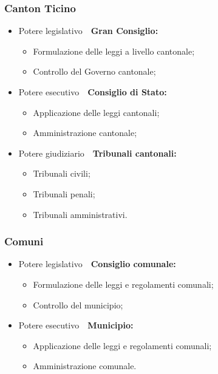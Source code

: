 \documentclass{article}
\begin{document}
\subsubsection{Canton Ticino}
\begin{itemize}
    \item Potere legislativo\ \textrightarrow\ \textbf{Gran Consiglio:}
        \begin{itemize}
            \item Formulazione delle leggi a livello cantonale;
            \item Controllo del Governo cantonale;
        \end{itemize}
    \item Potere esecutivo\ \textrightarrow\ \textbf{Consiglio di Stato:}
        \begin{itemize}
            \item Applicazione delle leggi cantonali;
            \item Amministrazione cantonale;
        \end{itemize}
    \item Potere giudiziario\ \textrightarrow\ \textbf{Tribunali cantonali:}
        \begin{itemize}
            \item Tribunali civili;
            \item Tribunali penali;
            \item Tribunali amministrativi.
        \end{itemize}
\end{itemize}

\subsubsection{Comuni}
\begin{itemize}
    \item Potere legislativo\ \textrightarrow\ \textbf{Consiglio comunale:}
        \begin{itemize}
            \item Formulazione delle leggi e regolamenti comunali;
            \item Controllo del municipio;
        \end{itemize}
    \item Potere esecutivo\ \textrightarrow\ \textbf{Municipio:}
        \begin{itemize}
            \item Applicazione delle leggi e regolamenti comunali;
            \item Amministrazione comunale.
        \end{itemize}
\end{itemize}
\end{document}
